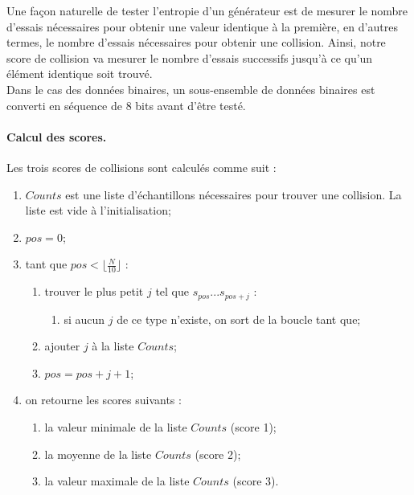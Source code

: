 Une façon naturelle de tester l'entropie d'un générateur est de mesurer le nombre d'essais nécessaires pour obtenir une valeur identique à la première, en d'autres termes, le nombre d'essais nécessaires pour obtenir une collision. Ainsi, notre score de collision va mesurer le nombre d'essais successifs jusqu'à ce qu'un élément identique soit trouvé.\\


Dans le cas des données binaires, un sous-ensemble de données binaires est converti en séquence de 8 bits avant d'être testé. \\

\paragraph{Calcul des scores.\\}
Les trois scores de collisions sont calculés comme suit : 
\begin{enumerate}
\item $Counts$ est une liste d'échantillons nécessaires pour trouver une collision. La liste est vide à l'initialisation;
\item $pos=0$;
\item tant que $pos < \lfloor\frac{N}{10}\rfloor$ :
	\begin{enumerate}
	\item trouver le plus petit $j$ tel que $s_{pos} ... s_{pos+j}$ :
		\begin{enumerate}
		\item si aucun $j$ de ce type n'existe, on sort de la boucle tant que;
		\end{enumerate}
	\item ajouter $j$ à la liste $Counts$;
	\item $pos = pos + j + 1$;
	\end{enumerate}
\item on retourne les scores suivants : 
	\begin{enumerate}
	\item la valeur minimale de la liste $Counts$ (score 1);
	\item la moyenne de la liste $Counts$ (score 2);
	\item la valeur maximale de la liste $Counts$ (score 3).\\
	\end{enumerate}
\end{enumerate}

